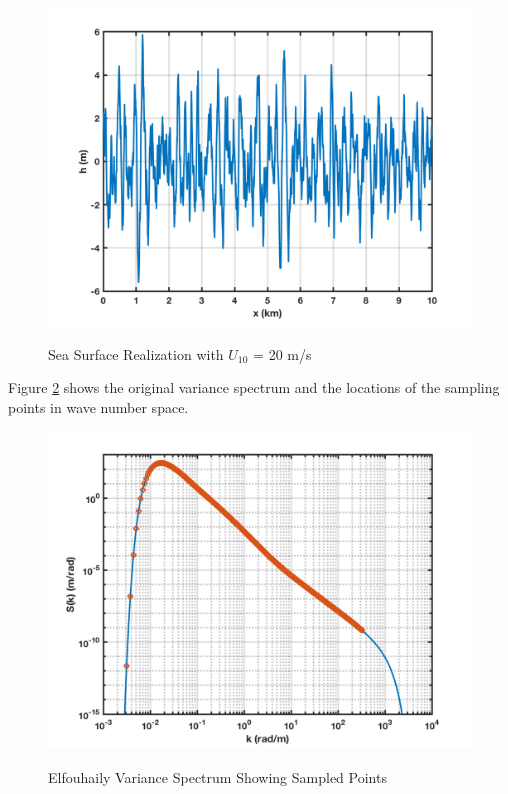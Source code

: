 \begin{figure}[H]
  \begin{center}
\includegraphics[width=5in]{../media/realized_sea_surface_20m_per_s.png}
  \end{center}
  \renewcommand{\baselinestretch}{1} \small\normalsize
  \begin{quote}
    \caption[Sea Surface Realization with $U_{10}$ = 20 m/s]{Sea Surface Realization with $U_{10}$ = 20 m/s\label{os_fig:7}}
  \end{quote}
\end{figure}
\renewcommand{\baselinestretch}{2} \small\normalsize

Figure \ref{os_fig:8} shows the original variance spectrum and the locations of the sampling points in wave number space.

\begin{figure}[H]
  \begin{center}
\includegraphics[width=5in]{../media/sampled_spectra_points.png}
  \end{center}
  \renewcommand{\baselinestretch}{1} \small\normalsize
  \begin{quote}
    \caption[Elfouhaily Variance Spectrum Showing Sampled Points]{Elfouhaily Variance Spectrum Showing Sampled Points\label{os_fig:8}}
  \end{quote}
\end{figure}
\renewcommand{\baselinestretch}{2} \small\normalsize

